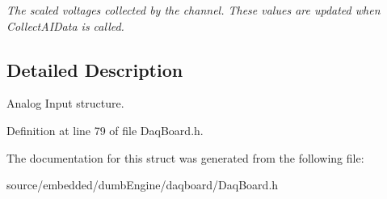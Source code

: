 \begin{DoxyCompactItemize}
\begin{DoxyCompactList}\small\item\em The scaled voltages collected by the channel. These values are updated when Collect\-A\-I\-Data is called. \end{DoxyCompactList}\end{DoxyCompactItemize}


\subsection{Detailed Description}
Analog Input structure. 

Definition at line 79 of file Daq\-Board.\-h.



The documentation for this struct was generated from the following file\-:\begin{DoxyCompactItemize}
\item 
source/embedded/dumb\-Engine/daqboard/Daq\-Board.\-h\end{DoxyCompactItemize}

